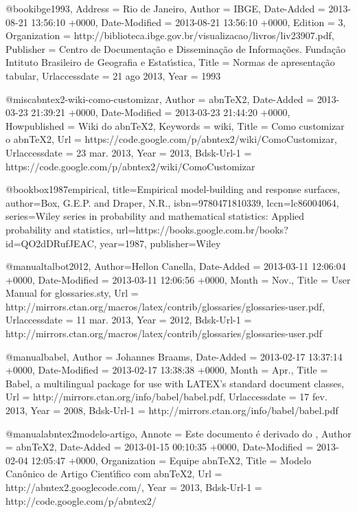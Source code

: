 
@book{ibge1993,
	Address = {Rio de Janeiro},
	Author = {IBGE},
	Date-Added = {2013-08-21 13:56:10 +0000},
	Date-Modified = {2013-08-21 13:56:10 +0000},
	Edition = {3},
	Organization = {http://biblioteca.ibge.gov.br/visualizacao/livros/liv23907.pdf},
	Publisher = {Centro de Documenta{\c c}{\~a}o e Dissemina{\c c}{\~a}o de Informa{\c c}{\~o}es. Funda{\c c}{\~a}o Intituto Brasileiro de Geografia e Estat{\'\i}stica},
	Title = {Normas de apresenta{\c c}{\~a}o tabular},
	Urlaccessdate = {21 ago 2013},
	Year = {1993}}

@misc{abntex2-wiki-como-customizar,
	Author = {abnTeX2},
	Date-Added = {2013-03-23 21:39:21 +0000},
	Date-Modified = {2013-03-23 21:44:20 +0000},
	Howpublished = {Wiki do abnTeX2},
	Keywords = {wiki},
	Title = {Como customizar o abnTeX2},
	Url = {https://code.google.com/p/abntex2/wiki/ComoCustomizar},
	Urlaccessdate = {23 mar. 2013},
	Year = {2013},
	Bdsk-Url-1 = {https://code.google.com/p/abntex2/wiki/ComoCustomizar}}

@book{box1987empirical,
  title={Empirical model-building and response surfaces},
  author={Box, G.E.P. and Draper, N.R.},
  isbn={9780471810339},
  lccn={lc86004064},
  series={Wiley series in probability and mathematical statistics: Applied probability and statistics},
  url={https://books.google.com.br/books?id=QO2dDRufJEAC},
  year={1987},
  publisher={Wiley}
}

@manual{talbot2012,
	Author={Hellon Canella},
	Date-Added = {2013-03-11 12:06:04 +0000},
	Date-Modified = {2013-03-11 12:06:56 +0000},
	Month = {Nov.},
	Title = {User Manual for glossaries.sty},
	Url = {http://mirrors.ctan.org/macros/latex/contrib/glossaries/glossaries-user.pdf},
	Urlaccessdate = {11 mar. 2013},
	Year = {2012},
	Bdsk-Url-1 = {http://mirrors.ctan.org/macros/latex/contrib/glossaries/glossaries-user.pdf}}

@manual{babel,
	Author = {Johannes Braams},
	Date-Added = {2013-02-17 13:37:14 +0000},
	Date-Modified = {2013-02-17 13:38:38 +0000},
	Month = {Apr.},
	Title = {Babel, a multilingual package for use with LATEX's standard document classes},
	Url = {http://mirrors.ctan.org/info/babel/babel.pdf},
	Urlaccessdate = {17 fev. 2013},
	Year = {2008},
	Bdsk-Url-1 = {http://mirrors.ctan.org/info/babel/babel.pdf}}

@manual{abntex2modelo-artigo,
	Annote = {Este documento {\'e} derivado do \cite{abnt-bibtex-doc}},
	Author = {abnTeX2},
	Date-Added = {2013-01-15 00:10:35 +0000},
	Date-Modified = {2013-02-04 12:05:47 +0000},
	Organization = {Equipe abnTeX2},
	Title = {Modelo Can{\^o}nico de Artigo Cient{\'\i}fico com abnTeX2},
	Url = {http://abntex2.googlecode.com/},
	Year = {2013},
	Bdsk-Url-1 = {http://code.google.com/p/abntex2/}}

